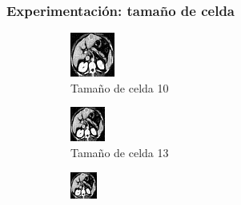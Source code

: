 \documentclass{beamer}
\begin{document}
\begin{frame}
\frametitle{Experimentación: tamaño de celda}

\begin{figure}
\centering

\begin{subfigure}{0.4\linewidth}
  \centering
  \includegraphics[width=0.6\linewidth]{celdas/tomo2-10-0}
  \caption{Tamaño de celda 10}
\end{subfigure}%
\begin{subfigure}{0.4\linewidth}
  \centering
  \includegraphics[width=0.6\linewidth]{celdas/tomo2-13-0}
  \caption{Tamaño de celda 13}
\end{subfigure}
\begin{subfigure}{0.4\linewidth}
  \centering
  \includegraphics[width=0.6\linewidth]{celdas/tomo2-17-0}

\end{subfigure}
\end{figure}
\end{frame}
\end{document}
